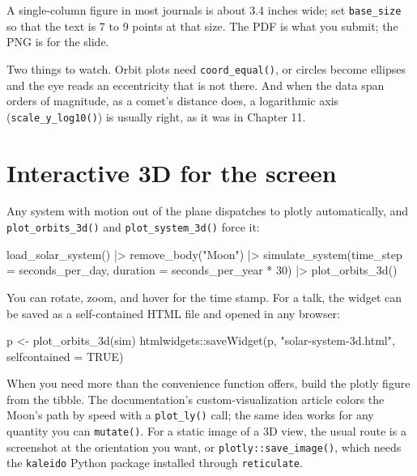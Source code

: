 \documentclass[
  10.5pt,
  letterpaper,
]{scrbook}
\newenvironment{Shaded}{\begin{snugshade}}{\end{snugshade}}
\newcommand{\AttributeTok}[1]{\textcolor[rgb]{0.00,0.00,0.00}{#1}}
\newcommand{\ConstantTok}[1]{\textcolor[rgb]{0.00,0.00,0.00}{#1}}
\newcommand{\DecValTok}[1]{\textcolor[rgb]{0.00,0.00,0.00}{#1}}
\newcommand{\FunctionTok}[1]{\textcolor[rgb]{0.00,0.00,0.00}{#1}}
\newcommand{\NormalTok}[1]{\textcolor[rgb]{0.00,0.00,0.00}{#1}}
\newcommand{\OtherTok}[1]{\textcolor[rgb]{0.00,0.00,0.00}{#1}}
\newcommand{\SpecialCharTok}[1]{\textcolor[rgb]{0.00,0.00,0.00}{#1}}
\newcommand{\StringTok}[1]{\textcolor[rgb]{0.00,0.00,0.00}{#1}}
\theoremstyle{definition}
\theoremstyle{plain}
\theoremstyle{remark}
\begin{document}
A single-column figure in most journals is about 3.4 inches wide; set
\texttt{base\_size} so that the text is 7 to 9 points at that size. The
PDF is what you submit; the PNG is for the slide.

Two things to watch. Orbit plots need \texttt{coord\_equal()}, or
circles become ellipses and the eye reads an eccentricity that is not
there. And when the data span orders of magnitude, as a comet's distance
does, a logarithmic axis (\texttt{scale\_y\_log10()}) is usually right,
as it was in Chapter 11.

\section{Interactive 3D for the
screen}\label{interactive-3d-for-the-screen}

Any system with motion out of the plane dispatches to plotly
automatically, and \texttt{plot\_orbits\_3d()} and
\texttt{plot\_system\_3d()} force it:

\begin{Shaded}
\begin{Highlighting}[]
\FunctionTok{load\_solar\_system}\NormalTok{() }\SpecialCharTok{|\textgreater{}}
  \FunctionTok{remove\_body}\NormalTok{(}\StringTok{"Moon"}\NormalTok{) }\SpecialCharTok{|\textgreater{}}
  \FunctionTok{simulate\_system}\NormalTok{(}\AttributeTok{time\_step =}\NormalTok{ seconds\_per\_day, }\AttributeTok{duration =}\NormalTok{ seconds\_per\_year }\SpecialCharTok{*} \DecValTok{30}\NormalTok{) }\SpecialCharTok{|\textgreater{}}
  \FunctionTok{plot\_orbits\_3d}\NormalTok{()}
\end{Highlighting}
\end{Shaded}

You can rotate, zoom, and hover for the time stamp. For a talk, the
widget can be saved as a self-contained HTML file and opened in any
browser:

\begin{Shaded}
\begin{Highlighting}[]
\NormalTok{p }\OtherTok{\textless{}{-}} \FunctionTok{plot\_orbits\_3d}\NormalTok{(sim)}
\NormalTok{htmlwidgets}\SpecialCharTok{::}\FunctionTok{saveWidget}\NormalTok{(p, }\StringTok{"solar{-}system{-}3d.html"}\NormalTok{, }\AttributeTok{selfcontained =} \ConstantTok{TRUE}\NormalTok{)}
\end{Highlighting}
\end{Shaded}

When you need more than the convenience function offers, build the
plotly figure from the tibble. The documentation's custom-visualization
article colors the Moon's path by speed with a \texttt{plot\_ly()} call;
the same idea works for any quantity you can \texttt{mutate()}. For a
static image of a 3D view, the usual route is a screenshot at the
orientation you want, or \texttt{plotly::save\_image()}, which needs the
\texttt{kaleido} Python package installed through \texttt{reticulate}.
\end{document}
